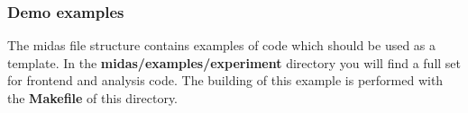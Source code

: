  \hypertarget{Q_Linux_Q_Linux_Demo_Examples}{}\subsubsection{Demo examples}\label{Q_Linux_Q_Linux_Demo_Examples}
The midas file structure contains examples of code which should be used as a template. In the {\bfseries  midas/examples/experiment} directory you will find a full set for frontend and analysis code. The building of this example is performed with the {\bfseries Makefile} of this directory. 


